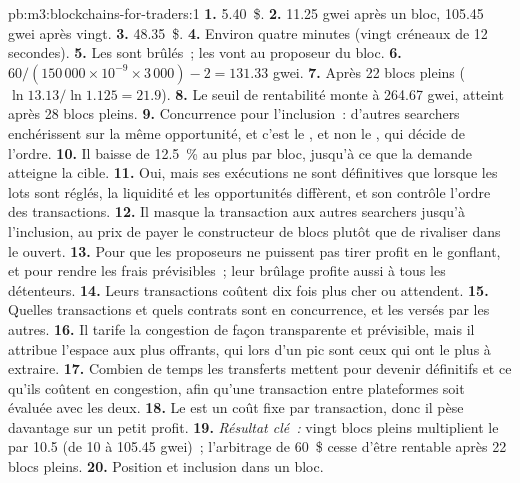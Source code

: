 \begin{solution}{pb:m3:blockchains-for-traders:1}
\textbf{1.} 5.40~\$. \textbf{2.} 11.25 gwei après un bloc, 105.45 gwei après vingt. \textbf{3.} 48.35~\$.
\textbf{4.} Environ quatre minutes (vingt créneaux de 12 secondes). \textbf{5.} Les  sont brûlés~; les  vont au
proposeur du bloc. \textbf{6.} $60/(150\,000 \times 10^{-9} \times 3\,000) - 2 = 131.33$ gwei. \textbf{7.} Après
22 blocs pleins ($\ln 13.13/\ln 1.125 = 21.9$). \textbf{8.} Le seuil de rentabilité monte à 264.67 gwei, atteint après 28
blocs pleins. \textbf{9.} Concurrence pour l'inclusion~: d'autres searchers enchérissent sur la même opportunité, et c'est le , et non
le , qui décide de l'ordre. \textbf{10.} Il baisse de 12.5~\% au plus par bloc, jusqu'à ce que la demande atteigne la cible.
\textbf{11.} Oui, mais ses exécutions ne sont définitives que lorsque les lots sont réglés, la liquidité et les opportunités diffèrent, et son
 contrôle l'ordre des transactions. \textbf{12.} Il masque la transaction aux autres searchers jusqu'à l'inclusion, au
prix de payer le constructeur de blocs plutôt que de rivaliser dans le  ouvert. \textbf{13.} Pour que les proposeurs ne puissent pas tirer profit
en le gonflant, et pour rendre les frais prévisibles~; leur brûlage profite aussi à tous les détenteurs. \textbf{14.} Leurs
transactions coûtent dix fois plus cher ou attendent. \textbf{15.} Quelles transactions et quels contrats sont en concurrence, et les 
versés par les autres. \textbf{16.} Il tarife la congestion de façon transparente et prévisible, mais il attribue l'espace aux plus
offrants, qui lors d'un pic sont ceux qui ont le plus à extraire. \textbf{17.} Combien de temps les transferts mettent pour devenir définitifs et
ce qu'ils coûtent en congestion, afin qu'une transaction entre plateformes soit évaluée avec les deux. \textbf{18.} Le  est un coût fixe par
transaction, donc il pèse davantage sur un petit profit. \textbf{19.} \emph{Résultat clé~:} vingt blocs pleins
multiplient le  par 10.5 (de 10 à 105.45 gwei)~; l'arbitrage de 60~\$ cesse d'être rentable après 22 blocs pleins.
\textbf{20.} Position et inclusion dans un bloc.
\end{solution}

